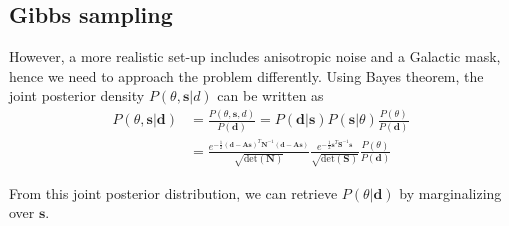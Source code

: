 \documentclass[twocolumn]{../common/aa}
\begin{document}
\subsection{Gibbs sampling}

However, a more realistic set-up includes anisotropic noise and a Galactic mask, hence we need to approach the problem differently. Using Bayes theorem, the joint posterior density $P(\theta, \textbf{s} | d)$ can be written as
\begin{align}
    \nonumber
    P(\theta, \textbf{s} | \textbf{d}) &= \frac{P(\theta, \textbf{s}, d)}{P(\textbf{d})} = P(\textbf{d} | \textbf{s})P(\textbf{s}| \theta)\frac{P(\theta)}{P(\textbf{d})}\\
    \label{eq:joint-posterior}
    &= \frac{e^{-\frac12 \left(\textbf{d}-\textbf{A}\textbf{s} \right)^T \mathbf{N}^{-1}\left(\textbf{d}-\textbf{A}\textbf{s} \right)}}{\sqrt{\mathrm{det}\left(\mathbf{N}\right)}}
    \frac{e^{-\frac12 \textbf{s}^T \mathbf{S}^{-1}\textbf{s}}}{\sqrt{\mathrm{det}\left(\mathbf{S}\right)}}\frac{P(\theta)}{P(\mathbf{d})}
\end{align}

From this joint posterior distribution, we can retrieve $P(\theta | \mathbf{d})$ by marginalizing over $\mathbf{s}$.
\end{document}
